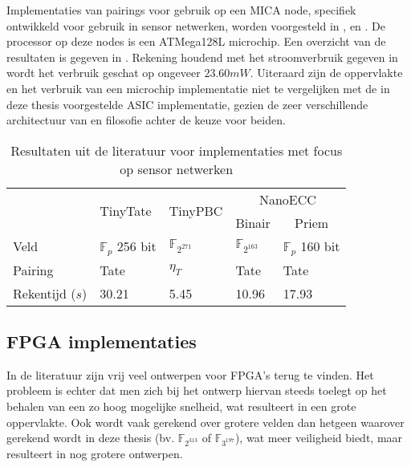 Implementaties van pairings voor gebruik op een MICA node, specifiek ontwikkeld voor gebruik in sensor netwerken, worden voorgesteld in \cite{tinytate}, \cite{tinypbc} en \cite{nanoecc}. De processor op deze nodes is een ATMega128L microchip. Een overzicht van de resultaten is gegeven in . Rekening houdend met het stroomverbruik gegeven in \cite{nanoecc} wordt het verbruik geschat op ongeveer $23.60mW$. Uiteraard zijn de oppervlakte en het verbruik van een microchip implementatie niet te vergelijken met de in deze thesis voorgestelde ASIC implementatie, gezien de zeer verschillende architectuur van en filosofie achter de keuze voor beiden.

\begin{table}[h]
	\caption{Resultaten uit de literatuur voor implementaties met focus op sensor netwerken}
	\label{tabel-resultaten-sensor}

	\centering
	\begin{tabular}{lllll}
		\toprule
		& \multirow{2}{*}{TinyTate \cite{tinytate}}	& \multirow{2}{*}{TinyPBC \cite{tinypbc}} &	\multicolumn{2}{c}{NanoECC \cite{nanoecc}}\\
		\cmidrule{4-5}
		& & & \multicolumn{1}{c}{Binair} & \multicolumn{1}{c}{Priem}\\
			\midrule
		Veld					& $\mathbb{F}_{p}$ 256 bit	& $\mathbb{F}_{2^{271}}$	& $\mathbb{F}_{2^{163}}$	& $\mathbb{F}_{p}$ 160 bit\\
		Pairing				& Tate							& $\eta_T$ 						& Tate							& Tate\\
		Rekentijd ($s$)	& 30.21							& 5.45							& 10.96							& 17.93\\
		\bottomrule
	\end{tabular}
\end{table}

\subsection{FPGA implementaties}

In de literatuur zijn vrij veel ontwerpen voor FPGA's terug te vinden. Het probleem is echter dat men zich bij het ontwerp hiervan steeds toelegt op het behalen van een zo hoog mogelijke snelheid, wat resulteert in een grote oppervlakte. Ook wordt vaak gerekend over grotere velden dan hetgeen waarover gerekend wordt in deze thesis (bv. $\mathbb{F}_{2^{313}}$ of $\mathbb{F}_{3^{197}}$), wat meer veiligheid biedt, maar resulteert in nog grotere ontwerpen.

